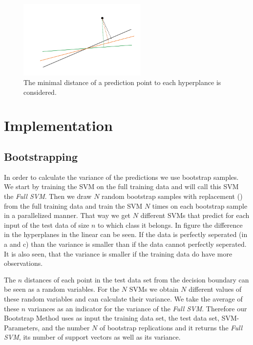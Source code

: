 \documentclass[a4paper]{article}
\begin{document}
\begin{figure}[!htb]
\begin{center}
\includegraphics[width=2.5in]{abb/distances.jpg}
\caption{The minimal distance of a prediction point to each hyperplance is considered.}
\label{fig1}
\end{center}
\end{figure}




\section{Implementation}

\subsection{Bootstrapping}
In order to calculate the variance of the predictions we use bootstrap samples. We start by training the SVM on the full training data and will call this SVM the \textit{Full SVM}. Then we draw $N$ random bootstrap samples with replacement (\cite{christmann_bootstrap_2013}) from the full training data and train the SVM $N$ times on each bootstrap sample in a parallelized manner. That way we get $N$ different SVMs that predict for each input of the test data of size $n$ to which class it belongs. In figure \label{fig2} the difference in the hyperplanes in the linear can be seen. If the data is perfectly seperated (in a and c) than the variance is smaller than if the data cannot perfectly seperated. It is also seen, that the variance is smaller if the training data do have more observations.

The $n$ distances of each point in the test data set from the decision boundary can be seen as a random variables. For the $N$ SVMs we obtain $N$ different values of these random variables and can calculate their variance. We take the average of these $n$ variances as an indicator for the variance of the \textit{Full SVM}. Therefore our Bootstrap Method uses as input the training data set, the test data set, SVM-Parameters, and the number $N$ of bootstrap replications and it returns the \textit{Full SVM}, its number of support vectors as well as its variance.
\end{document}
